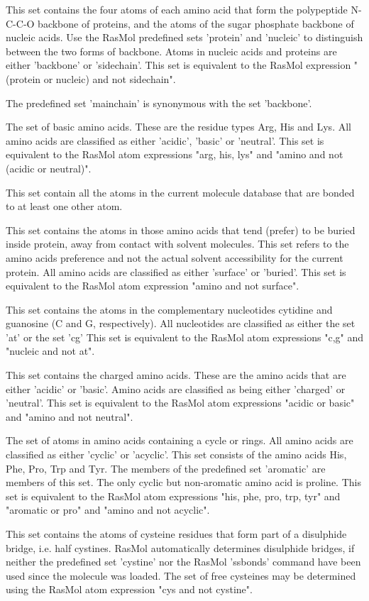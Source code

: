 This set contains the four atoms of each amino acid that form the
polypeptide N-C-C-O backbone of proteins, and the atoms of the sugar
phosphate backbone of nucleic acids.
Use the RasMol predefined sets
'protein'
and
'nucleic'
to distinguish between the two forms of backbone.
Atoms in nucleic acids and proteins are either
'backbone'
or
'sidechain'.
This set is equivalent to the RasMol expression
"(protein or nucleic) and not sidechain".

The predefined set
'mainchain'
is synonymous with the set
'backbone'.

The set of basic amino acids.
These are the residue types Arg, His and Lys.
All amino acids are classified as either
'acidic',
'basic'
or
'neutral'.
This set is equivalent to the RasMol atom expressions
"arg, his, lys"
and
"amino and not (acidic or neutral)".

This set contain all the atoms in the current molecule database that
are bonded to at least one other atom.

This set contains the atoms in those amino acids that tend
(prefer) to be buried inside protein, away from contact with
solvent molecules. This set refers to the amino acids
preference and not the actual solvent accessibility for
the current protein.
All amino acids are classified as either
'surface'
or
'buried'.
This set is equivalent to the RasMol atom expression
"amino and not surface".

This set contains the atoms in the complementary nucleotides
cytidine and guanosine (C and G, respectively). All nucleotides
are classified as either the set
'at'
or the set
'cg'
This set is equivalent to the RasMol atom expressions
"c,g"
and
"nucleic and not at".

This set contains the charged amino acids. These are the amino
acids that are either
'acidic'
or
'basic'.
Amino acids are classified as being either
'charged'
or
'neutral'.
This set is equivalent to the RasMol atom expressions
"acidic or basic"
and
"amino and not neutral".

The set of atoms in amino acids containing a cycle or rings.
All amino acids are classified as either
'cyclic'
or
'acyclic'.
This set consists of the amino acids His, Phe, Pro, Trp and Tyr.
The members of the predefined set
'aromatic'
are members of this set.
The only cyclic but non-aromatic amino acid is proline.
This set is equivalent to the RasMol atom expressions
"his, phe, pro, trp, tyr"
and
"aromatic or pro"
and
"amino and not acyclic".

This set contains the atoms of cysteine residues that form part
of a disulphide bridge, i.e. half cystines. RasMol automatically
determines disulphide bridges, if neither the predefined set
'cystine'
nor the RasMol
'ssbonds'
command have been used since the molecule was loaded. The set of
free cysteines may be determined using the RasMol atom expression
"cys and not cystine".

